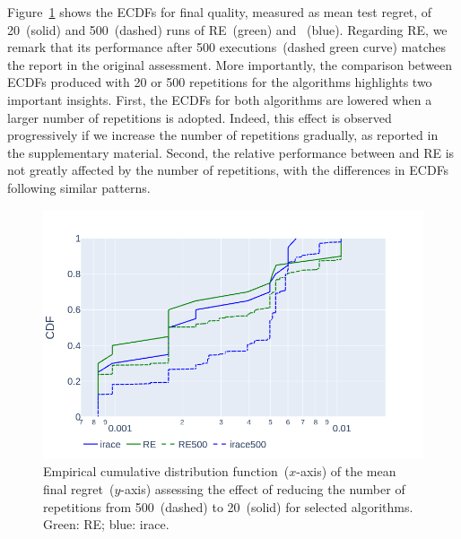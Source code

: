 Figure~\ref{fig:ecdf-repetitions} shows the ECDFs for final quality, measured as mean test regret, of 20~(solid) and 500~(dashed) runs of RE~(green) and \irace~(blue). 
Regarding RE, we remark that its performance after 500 executions~(dashed green curve) matches the report in the original \nasbench assessment. More importantly, the comparison between ECDFs produced with 20 or 500 repetitions for the algorithms highlights two important insights. First, the ECDFs for both algorithms are lowered when a larger number of repetitions is adopted. Indeed, this effect is observed progressively if we increase the number of repetitions gradually, as reported in the supplementary material. Second, the relative performance between \irace and RE is not greatly affected by the number of repetitions, with the differences in ECDFs following similar patterns. 

\begin{figure}[!t]
\centering
\includegraphics[width=0.8\linewidth, clip=true, trim=45px 20px 75px 50px]{imgs/ecdf-repetitions.png}
\caption{Empirical cumulative distribution function~($x$-axis) of the mean final regret~($y$-axis) assessing the effect of reducing the number of repetitions from 500~(dashed) to 20~(solid) for selected algorithms. Green: RE; blue: irace.}
\label{fig:ecdf-repetitions}
\end{figure}

